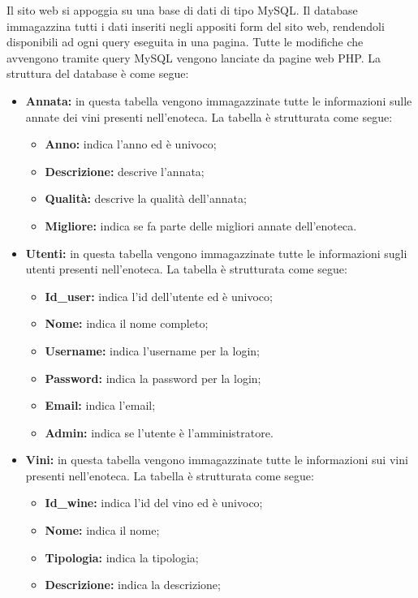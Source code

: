 Il sito web si appoggia su una base di dati di tipo MySQL. Il database immagazzina tutti i dati inseriti negli appositi form del sito web, rendendoli disponibili ad ogni query eseguita in una pagina. Tutte le modifiche che avvengono tramite query MySQL vengono lanciate da pagine web PHP. La struttura del database è come segue:

\begin{itemize}
	\item \textbf{Annata:} in questa tabella vengono immagazzinate tutte le
	informazioni sulle annate dei vini presenti nell'enoteca. La tabella è strutturata come segue:
	\begin{itemize}
		\item \textbf{Anno:} indica l'anno ed è univoco;
		\item \textbf{Descrizione:} descrive l'annata;
		\item \textbf{Qualità:} descrive la qualità dell'annata;
		\item \textbf{Migliore:} indica se fa parte delle migliori annate dell'enoteca.
	\end{itemize}	
	\item \textbf{Utenti:} in questa tabella vengono immagazzinate tutte le informazioni sugli utenti presenti nell'enoteca. La tabella è strutturata come segue:
	\begin{itemize}
		\item \textbf{Id\_user:} indica l'id dell'utente ed è univoco;
		\item \textbf{Nome:} indica il nome completo;
		\item \textbf{Username:} indica l'username per la login;
		\item \textbf{Password:} indica la password per la login;
		\item \textbf{Email:} indica l'email;
		\item \textbf{Admin:} indica se l'utente è l'amministratore.
	\end{itemize}
	\item \textbf{Vini:} in questa tabella vengono immagazzinate tutte le informazioni sui vini presenti nell'enoteca. La tabella è strutturata come segue:
	\begin{itemize}
		\item \textbf{Id\_wine:} indica l'id del vino ed è univoco;
		\item \textbf{Nome:} indica il nome;
		\item \textbf{Tipologia:} indica la tipologia;
		\item \textbf{Descrizione:} indica la descrizione;

\end{itemize}
\end{itemize}
